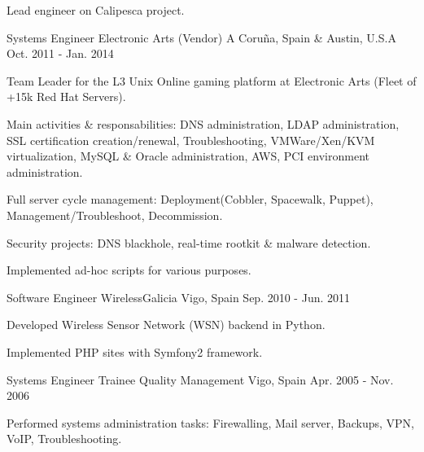\begin{cventries}
{\begin{cvitems}
        \item {Lead engineer on Calipesca project.}
      \end{cvitems}
    }
  \cventry
    {Systems Engineer} %
    {Electronic Arts (Vendor)} %
    {A Coruña, Spain \& Austin, U.S.A} %
    {Oct. 2011 - Jan. 2014} %
    {
      \begin{cvitems} %
        \item {Team Leader for the L3 Unix Online gaming platform at Electronic Arts (Fleet of +15k Red Hat Servers).}
        \item {Main activities \& responsabilities: DNS administration, LDAP administration, SSL certification creation/renewal, Troubleshooting, VMWare/Xen/KVM virtualization, MySQL \& Oracle administration, AWS, PCI environment administration. }
	\item {Full server cycle management: Deployment(Cobbler, Spacewalk, Puppet), Management/Troubleshoot, Decommission.} 
	\item {Security projects: DNS blackhole, real-time rootkit \& malware detection.} 
	\item {Implemented ad-hoc scripts for various purposes.} 
      \end{cvitems}
    }
  \cventry
    {Software Engineer} %
    {WirelessGalicia} %
    {Vigo, Spain} %
    {Sep. 2010 - Jun. 2011} %
    {
      \begin{cvitems} %
        \item {Developed Wireless Sensor Network (WSN) backend in Python.}
        \item {Implemented PHP sites with Symfony2 framework.}
      \end{cvitems} 
    }
  \cventry
    {Systems Engineer Trainee} %
    {Quality Management} %
    {Vigo, Spain} %
    {Apr. 2005 - Nov. 2006} %
    {
      \begin{cvitems} %
        \item {Performed systems administration tasks: Firewalling, Mail server, Backups, VPN, VoIP, Troubleshooting.}
      \end{cvitems}
    }

\end{cventries}
